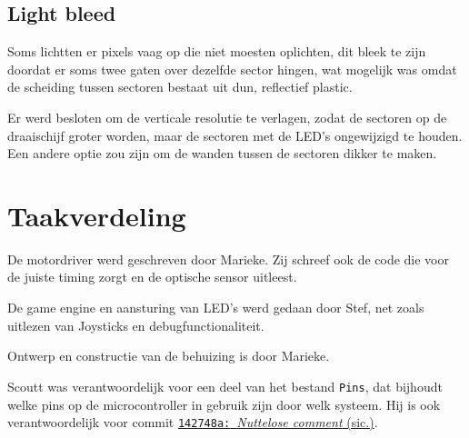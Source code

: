 \documentclass[12pt]{ugentreport}
\begin{document}
\subsection{Light bleed}
Soms lichtten er pixels vaag op die niet moesten oplichten,
dit bleek te zijn doordat er soms twee gaten over dezelfde sector hingen, wat
mogelijk was omdat de scheiding tussen sectoren bestaat uit dun, reflectief
plastic.

Er werd besloten om de verticale resolutie te verlagen, zodat de sectoren op de
draaischijf groter worden, maar de sectoren met de LED's ongewijzigd te houden.
Een andere optie zou zijn om de wanden tussen de sectoren dikker te maken.

\section{Taakverdeling}
De motordriver werd geschreven door Marieke. Zij schreef ook de code die voor de
juiste timing zorgt en de optische sensor uitleest.

De game engine en aansturing van LED's werd gedaan door Stef,
net zoals uitlezen van Joysticks en debugfunctionaliteit.

Ontwerp en constructie van de behuizing is door Marieke.

Scoutt was verantwoordelijk voor een deel van het bestand \texttt{Pins},
dat bijhoudt welke pins op de microcontroller in gebruik zijn door welk systeem.
Hij is ook verantwoordelijk voor commit
\href{https://github.com/Epse/MCU_Project_PlanetFight/commit/142748a7c49a4552b92dfe5613a2f1f7b7a7eb75}{\texttt{142748a:}~\textit{Nuttelose
    comment} (sic.)}.
\end{document}
